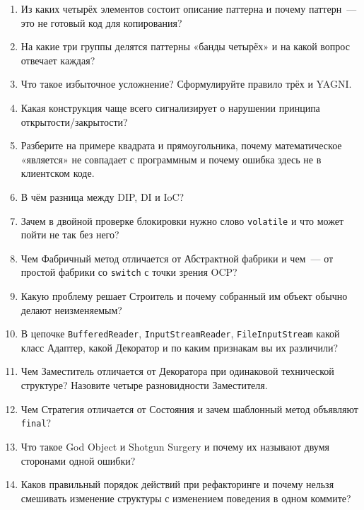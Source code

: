 \kontrolvoprosy

\begin{enumerate}
\item Из каких четырёх элементов состоит описание паттерна и почему паттерн~---
      это не готовый код для копирования?
\item На какие три группы делятся паттерны «банды четырёх» и на какой вопрос
      отвечает каждая?
\item Что такое избыточное усложнение? Сформулируйте правило трёх и YAGNI.
\item Какая конструкция чаще всего сигнализирует о нарушении принципа
      открытости/закрытости?
\item Разберите на примере квадрата и прямоугольника, почему математическое
      «является» не совпадает с программным и почему ошибка здесь не в
      клиентском коде.
\item В чём разница между DIP, DI и IoC?
\item Зачем в двойной проверке блокировки нужно слово \texttt{volatile} и что
      может пойти не так без него?
\item Чем Фабричный метод отличается от Абстрактной фабрики и чем~--- от
      простой фабрики со \texttt{switch} с точки зрения OCP?
\item Какую проблему решает Строитель и почему собранный им объект обычно
      делают неизменяемым?
\item В цепочке \texttt{BufferedReader}, \texttt{InputStreamReader},
      \texttt{FileInputStream} какой класс Адаптер, какой Декоратор и по каким
      признакам вы их различили?
\item Чем Заместитель отличается от Декоратора при одинаковой технической
      структуре? Назовите четыре разновидности Заместителя.
\item Чем Стратегия отличается от Состояния и зачем шаблонный метод объявляют
      \texttt{final}?
\item Что такое God Object и Shotgun Surgery и почему их называют двумя
      сторонами одной ошибки?
\item Каков правильный порядок действий при рефакторинге и почему нельзя
      смешивать изменение структуры с изменением поведения в одном коммите?
\end{enumerate}

\testzadaniya


